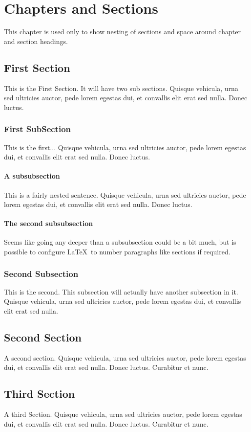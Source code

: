 \chapter{Chapters and Sections}
This chapter is used only to show nesting of sections and space around chapter and section headings.

\section{First Section}
This is the First Section. It will have two sub sections. %
 Quisque vehicula, urna sed
ultricies auctor, pede lorem egestas dui, et convallis elit erat sed nulla. Donec luctus. 

\subsection{First SubSection}
This is the first... %
 Quisque vehicula, urna sed
ultricies auctor, pede lorem egestas dui, et convallis elit erat sed nulla. Donec luctus. 


\subsubsection{A subsubsection}
This is a fairly nested sentence. %
 Quisque vehicula, urna sed
ultricies auctor, pede lorem egestas dui, et convallis elit erat sed nulla. Donec luctus. 

\subsubsection{The second subsubsection}
Seems like going any deeper than a subsubsection could be a bit much, but is possible to configure \LaTeX\ to number paragraphs like sections if required.

\subsection{Second Subsection}
This is the second. This subsection will actually have another subsection in it.%
  Quisque vehicula, urna sed
 ultricies auctor, pede lorem egestas dui, et convallis elit erat sed nulla.

\section{Second Section}
A second section. %
 Quisque vehicula, urna sed
ultricies auctor, pede lorem egestas dui, et convallis elit erat sed nulla. Donec luctus. Curabitur
et nunc. 

\section{Third Section}
A third Section. %
 Quisque vehicula, urna sed
ultricies auctor, pede lorem egestas dui, et convallis elit erat sed nulla. Donec luctus. Curabitur
et nunc. 